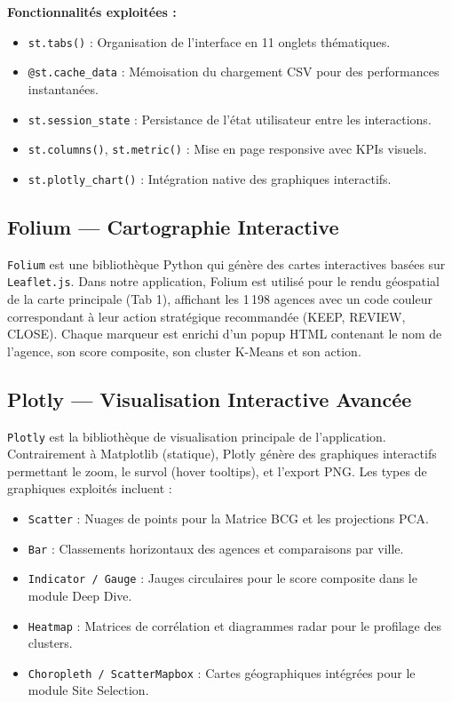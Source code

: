 \textbf{Fonctionnalités exploitées :}
\begin{itemize}
    \item \texttt{st.tabs()} : Organisation de l'interface en 11 onglets thématiques.
    \item \texttt{@st.cache\_data} : Mémoisation du chargement CSV pour des performances instantanées.
    \item \texttt{st.session\_state} : Persistance de l'état utilisateur entre les interactions.
    \item \texttt{st.columns()}, \texttt{st.metric()} : Mise en page responsive avec KPIs visuels.
    \item \texttt{st.plotly\_chart()} : Intégration native des graphiques interactifs.
\end{itemize}

\subsection{Folium — Cartographie Interactive}

\texttt{Folium} est une bibliothèque Python qui génère des cartes interactives basées sur \texttt{Leaflet.js}. Dans notre application, Folium est utilisé pour le rendu géospatial de la carte principale (Tab 1), affichant les 1\,198 agences avec un code couleur correspondant à leur action stratégique recommandée (KEEP, REVIEW, CLOSE). Chaque marqueur est enrichi d'un popup HTML contenant le nom de l'agence, son score composite, son cluster K-Means et son action.

\subsection{Plotly — Visualisation Interactive Avancée}

\texttt{Plotly} est la bibliothèque de visualisation principale de l'application. Contrairement à Matplotlib (statique), Plotly génère des graphiques interactifs permettant le zoom, le survol (hover tooltips), et l'export PNG. Les types de graphiques exploités incluent :
\begin{itemize}
    \item \texttt{Scatter} : Nuages de points pour la Matrice BCG et les projections PCA.
    \item \texttt{Bar} : Classements horizontaux des agences et comparaisons par ville.
    \item \texttt{Indicator / Gauge} : Jauges circulaires pour le score composite dans le module Deep Dive.
    \item \texttt{Heatmap} : Matrices de corrélation et diagrammes radar pour le profilage des clusters.
    \item \texttt{Choropleth / ScatterMapbox} : Cartes géographiques intégrées pour le module Site Selection.
\end{itemize}

